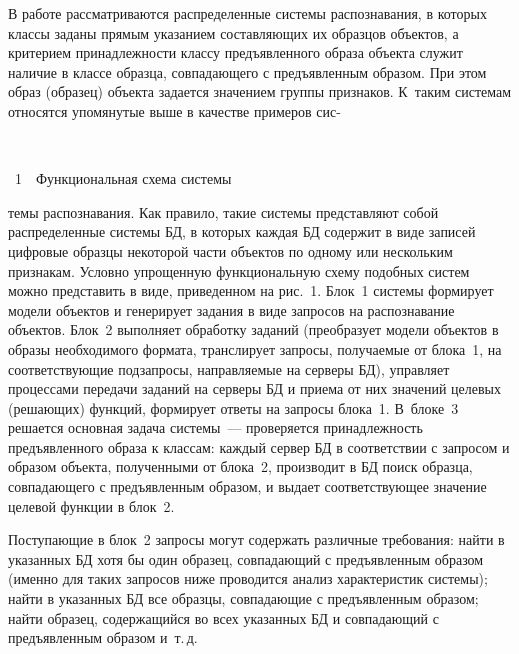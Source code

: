 \begin{multicols}{2}
В работе рассматриваются распределенные сис\-те\-мы распознавания, в которых
классы заданы \mbox{прямым} указанием составляющих их образцов объектов, а
критерием принадлежности классу предъявленного образа объекта служит
наличие в классе образца, совпадающего с предъявленным образом. При этом
образ (образец) объекта задается значением группы признаков. К~таким
системам относятся упомянутые выше в качестве примеров сис-\linebreak\vspace*{-12pt}


\pagebreak

\begin{center}  %
\vspace*{2pt}
\mbox{%
\epsfxsize=76mm
}
  \vspace*{2pt}

{{\figurename~1}\ \ \small{Функциональная схема системы}}
  \end{center}

\vspace*{3pt}


\addtocounter{figure}{1}

\noindent
те\-мы
распознавания. Как правило, такие системы
 представляют собой
распределенные системы БД, в которых каждая БД содержит в
виде записей цифровые образцы некоторой части объектов по одному или
нескольким признакам. Условно упрощенную функциональную схему
подобных систем можно представить в виде, приведенном на рис.~1. Блок~1
системы формирует модели объектов и генерирует задания в виде запросов на
распознавание объектов. Блок~2 выполняет обработку заданий (преобразует
модели объектов в образы необходимого формата, транслирует запросы,
получаемые от блока~1, на соответствующие подзапросы, направляемые на
серверы БД), управ\-ля\-ет процессами передачи заданий на серверы БД и приема
от них значений целевых (решающих) функций, формирует ответы на запросы
блока~1. В~блоке~3 решается основная задача системы~--- проверяется
принадлежность предъявленного образа к классам: каждый сервер БД в
соответствии с запросом и образом объекта, полученными от блока~2,
производит в БД поиск образца, совпадающего с предъявленным образом, и
выдает со\-от\-вет\-ст\-ву\-ющее значение целевой функции в блок~2.


     Поступающие в блок~2 запросы могут содержать различные требования:
найти в указанных БД хотя бы один образец, совпадающий с предъявленным
образом (именно для таких запросов ниже проводится анализ характеристик
системы); найти в указанных БД все образцы, совпадающие с предъявленным
образом; найти образец, содержащийся во всех указанных БД и совпадающий с
предъявленным образом и~т.\,д.


\end{multicols}
